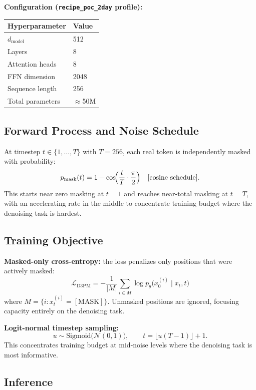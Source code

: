 \documentclass[11pt,a4paper]{article}
\begin{document}
\textbf{Configuration (\texttt{recipe\_poc\_2day} profile):}

\begin{center}
\begin{tabular}{ll}
\toprule
Hyperparameter & Value \\
\midrule
$d_\text{model}$ & 512 \\
Layers & 8 \\
Attention heads & 8 \\
FFN dimension & 2048 \\
Sequence length & 256 \\
Total parameters & $\approx$50M \\
\bottomrule
\end{tabular}
\end{center}

\subsection{Forward Process and Noise Schedule}

At timestep $t \in \{1, \ldots, T\}$ with $T = 256$, each real token is independently masked with probability:
\[
  p_\text{mask}(t) = 1 - \cos\!\Bigl(\frac{t}{T} \cdot \frac{\pi}{2}\Bigr) \quad \text{[cosine schedule]}.
\]
This starts near zero masking at $t=1$ and reaches near-total masking at $t=T$, with an accelerating rate in the middle to concentrate training budget where the denoising task is hardest.

\subsection{Training Objective}

\textbf{Masked-only cross-entropy:} the loss penalizes only positions that were actively masked:
\[
  \mathcal{L}_\text{D3PM} = -\frac{1}{|M|} \sum_{i \in M} \log p_\theta\!\bigl(x_0^{(i)} \mid x_t, t\bigr)
\]
where $M = \{i : x_t^{(i)} = [\text{MASK}]\}$. Unmasked positions are ignored, focusing capacity entirely on the denoising task.

\textbf{Logit-normal timestep sampling:}
\[
  u \sim \mathrm{Sigmoid}\!\bigl(\mathcal{N}(0,1)\bigr), \qquad t = \lfloor u(T-1) \rfloor + 1.
\]
This concentrates training budget at mid-noise levels where the denoising task is most informative.

\subsection{Inference}
\end{document}
